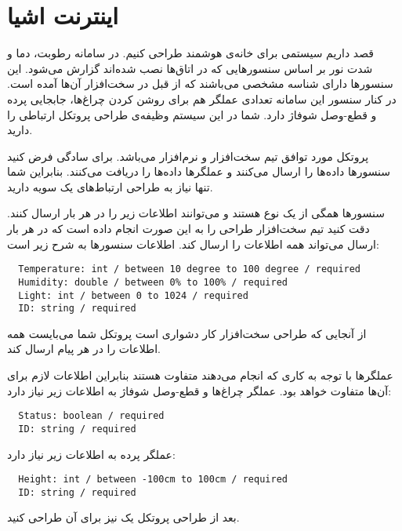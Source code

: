 \documentclass[../main.tex]{subfiles}
\begin{document}
\section{اینترنت اشیا}

قصد داریم سیستمی برای خانه‌ی هوشمند طراحی کنیم.
در سامانه رطوبت، دما و شدت نور بر اساس سنسورهایی که در اتاق‌ها نصب شده‌اند گزارش می‌شود.
این سنسورها دارای شناسه مشخصی می‌باشند که از قبل در سخت‌افزار آن‌ها آمده است.
در کنار سنسور این سامانه تعدادی عملگر هم برای روشن کردن چراغ‌ها، جابجایی پرده و قطع-وصل شوفاژ دارد.
شما در این سیستم وظیفه‌ی طراحی پروتکل ارتباطی را دارید.

پروتکل مورد توافق تیم سخت‌افزار و نرم‌افزار  می‌باشد. برای سادگی فرض کنید سنسورها داده‌ها را ارسال می‌کنند و عملگرها داده‌ها را دریافت می‌کنند.
بنابراین شما تنها نیاز به طراحی ارتباط‌های یک سویه دارید.

سنسورها همگی از یک نوع هستند و می‌توانند اطلاعات زیر را در هر بار ارسال کنند.
دقت کنید تیم سخت‌افزار طراحی را به این صورت انجام داده است که در هر بار ارسال می‌تواند همه اطلاعات را ارسال کند.
اطلاعات سنسورها به شرح زیر است:

\begin{latin}
\begin{lstlisting}
  Temperature: int / between 10 degree to 100 degree / required
  Humidity: double / between 0% to 100% / required
  Light: int / between 0 to 1024 / required
  ID: string / required
\end{lstlisting}
\end{latin}

از آنجایی که طراحی سخت‌افزار کار دشواری است پروتکل شما می‌بایست همه اطلاعات را در هر پیام ارسال کند.

عملگرها با توجه به کاری که انجام می‌دهند متفاوت هستند بنابراین اطلاعات لازم برای آن‌ها متفاوت خواهد بود.
عملگر چراغ‌ها و قطع-وصل شوفاژ به اطلاعات زیر نیاز دارد:

\begin{latin}
\begin{lstlisting}
  Status: boolean / required
  ID: string / required
\end{lstlisting}
\end{latin}

عملگر پرده به اطلاعات زیر نیاز دارد:

\begin{latin}
\begin{lstlisting}
  Height: int / between -100cm to 100cm / required
  ID: string / required
\end{lstlisting}
\end{latin}

بعد از طراحی پروتکل یک  نیز برای آن طراحی کنید.
\end{document}
